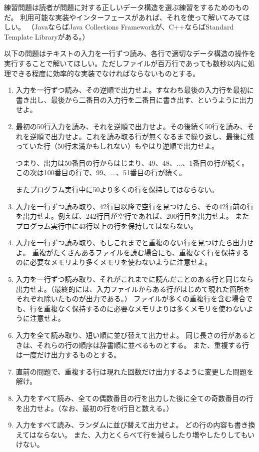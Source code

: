 \begin{exc}
練習問題は読者が問題に対する正しいデータ構造を選ぶ練習をするためのものだ。
利用可能な実装やインターフェースがあれば、それを使って解いてみてほしい。
（JavaならばJava Collections Frameworkが、C++ならばStandard Template Libraryがある。）

以下の問題はテキストの入力を一行ずつ読み、各行で適切なデータ構造の操作を実行することで解いてほしい。ただしファイルが百万行であっても数秒以内に処理できる程度に効率的な実装でなければならないものとする。

  \begin{enumerate}
    \item 入力を一行ずつ読み、その逆順で出力せよ。すなわち最後の入力行を最初に書き出し、最後から二番目の入力行を二番目に書き出す、というように出力せよ。

    \item  最初の50行入力を読み、それを逆順で出力せよ。その後続く50行を読み、それを逆順で出力せよ。これを読み取る行が無くなるまで繰り返し、最後に残っていた行（50行未満かもしれない）もやはり逆順で出力せよ。

      つまり、出力は50番目の行からはじまり、49、48、...、1番目の行が続く。
	  この次は100番目の行で、99、...、51番目の行が続く。

	 またプログラム実行中に50より多くの行を保持してはならない。

    \item 入力を一行ずつ読み取り、42行目以降で空行を見つけたら、その42行前の行を出力せよ。例えば、242行目が空行であれば、200行目を出力せよ。
	またプログラム実行中に43行以上の行を保持してはならない。

    \item 入力を一行ずつ読み取り、もしこれまでと重複のない行を見つけたら出力せよ。
	重複がたくさんあるファイルを読む場合にも、重複なく行を保持するのに必要なメモリより多くメモリを使わないように注意せよ。

    \item 入力を一行ずつ読み取り、それがこれまでに読んだことのある行と同じなら出力せよ。（最終的には、入力ファイルからある行がはじめて現れた箇所をそれぞれ除いたものが出力である。）
	ファイルが多くの重複行を含む場合でも、行を重複なく保持するのに必要なメモリよりは多くメモリを使わないように注意せよ。

    \item 入力を全て読み取り、短い順に並び替えて出力せよ。
	同じ長さの行があるときは、それらの行の順序は辞書順に並べるものとする。
	また、重複する行は一度だけ出力するものとする。

    \item 直前の問題で、重複する行は現れた回数だけ出力するように変更した問題を解け。

    \item 入力をすべて読み、全ての偶数番目の行を出力した後に全ての奇数番目の行を出力せよ。（なお、最初の行を0行目と数える。）

    \item 入力をすべて読み、ランダムに並び替えて出力せよ。
	どの行の内容も書き換えてはならない。
	また、入力とくらべて行を減らしたり増やしたりしてもいけない。
  \end{enumerate}
\end{exc}

